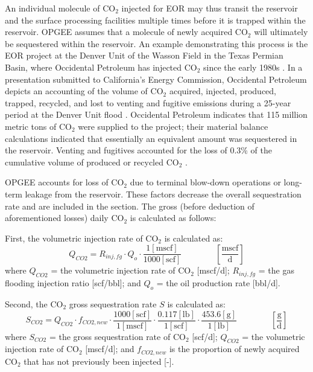 \documentclass[11pt]{report}
\newcommand{\eqnunitfrac}[2]{\quad\quad \scriptstyle{\left[\frac{\text{#1}}{\text{#2}}\right]}}
\begin{document}
An individual molecule of CO$_2$ injected for EOR may thus transit the reservoir and the surface processing facilities multiple times before it is trapped within the reservoir. OPGEE assumes that a molecule of newly acquired CO$_2$ will ultimately be sequestered within the reservoir. An example demonstrating this process is the EOR project at the Denver Unit of the Wasson Field in the Texas Permian Basin, where Occidental Petroleum has injected CO$_2$ since the early 1980s \cite{Oxy2015}. In a presentation submitted to California's Energy Commission, Occidental Petroleum depicts an accounting of the volume of CO$_2$ acquired, injected, produced, trapped, recycled, and lost to venting and fugitive emissions during a 25-year period at the Denver Unit flood \cite{Oxy2012}. Occidental Petroleum indicates that 115 million metric tons of CO$_2$ were supplied to the project; their material balance calculations indicated that essentially an equivalent amount was sequestered in the reservoir. Venting and fugitives accounted for the loss of 0.3\% of the cumulative volume of produced or recycled CO$_2$ \cite{Oxy2012}. 

OPGEE accounts for loss of CO$_2$ due to terminal blow-down operations or long-term leakage from the reservoir. These factors decrease the overall sequestration rate and are included in the  section. The gross (before deduction of aforementioned losses) daily CO$_2$ is calculated as follows:

First, the volumetric injection rate of CO$_2$ is calculated as: 
\begin{equation} \label{eq:VolumetricFloodGasInjectionRate}
Q_{CO2} = R_{inj,fg} \cdot Q_{o} \cdot \frac{1 [\text{mscf}]}{1000 [\text{scf}]} \quad\quad\eqnunitfrac{mscf}{d}
\end{equation}
where $Q_{CO2}$ = the volumetric injection rate of CO$_2$ [mscf/d]; $R_{inj,fg}$ = the gas flooding injection ratio [scf/bbl]; and $Q_{o}$ = the oil production rate [bbl/d].

Second, the CO$_2$ gross sequestration rate $S$ is calculated as: 
\begin{equation} \label{eq:CO2Sequestration}
S_{CO2} = Q_{CO2} \cdot f_{CO2,new} \cdot \frac{1000 [\text{scf}]}{1 [\text{mscf}]} \cdot \frac{0.117 [\text{lb}]}{1 [\text{scf}]} \cdot \frac{453.6 [\text{g}]}{1 [\text{lb}]} \quad\quad\eqnunitfrac{g}{d}
\end{equation}
where $S_{CO2}$ = the gross sequestration rate of CO$_2$ [scf/d]; $Q_{CO2}$ = the volumetric injection rate of CO$_2$ [mscf/d]; and $f_{CO2,new}$ is the proportion of newly acquired CO$_2$ that has not previously been injected [-].
\end{document}
